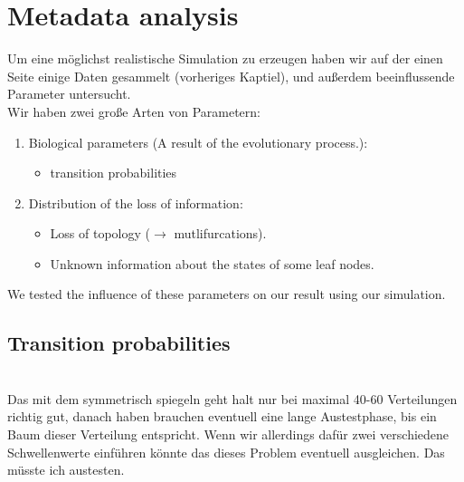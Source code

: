   \section{Metadata analysis}
    Um eine möglichst realistische Simulation zu erzeugen haben wir auf der einen Seite einige Daten 
      gesammelt (vorheriges Kaptiel), und außerdem beeinflussende Parameter untersucht. \\
    Wir haben zwei große Arten von Parametern:
    \begin{enumerate}
      \item Biological parameters (A result of the evolutionary process.):
        \begin{itemize}
          \item transition probabilities
        \end{itemize}
      \item Distribution of the loss of information:
        \begin{itemize}
          \item Loss of topology ($\rightarrow$ mutlifurcations).
          \item Unknown information about the states of some leaf nodes.
        \end{itemize}
    \end{enumerate}
    We tested the influence of these parameters on our result using our simulation. \\
   
    \subsection{Transition probabilities}
       \\
      Das mit dem symmetrisch spiegeln geht halt nur bei maximal 40-60 Verteilungen richtig gut, danach 
      haben brauchen eventuell eine lange Austestphase, bis ein Baum dieser Verteilung entspricht.
      Wenn wir allerdings dafür zwei verschiedene Schwellenwerte einführen könnte das dieses Problem 
      eventuell ausgleichen. Das müsste ich austesten. 

